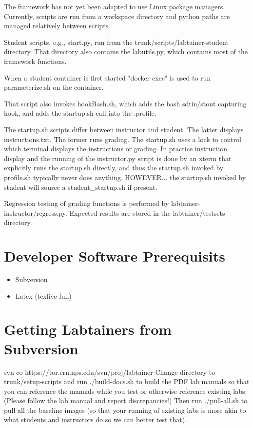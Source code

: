 The framework has not yet been adapted to use Linux package managers.
Currently, scripts are run from a workspace directory and python
paths are managed relatively between scripts.  

Student scripts, e.g., start.py, run from the trunk/scripts/labtainer-student directory.
That directory also contains the labutils.py, which contains most of the framework
functions.

When a student container is first started "docker exec" is used
to run parameterize.sh on the container.

That script also invokes hookBash.sh, which adds the bash
sdtin/stout capturing hook, and adds the startup.sh call
into the .profile.

The startup.sh scripts differ between instructor and student.  The latter
displays instructions.txt.  The former runs grading.
The startup.sh uses a lock to control which
terminal displays the instructions or grading.  In practice instruction
display and the running of the instructor.py script is done by
an xterm that explicitly runs the startup.sh directly, and thus
the startup.sh invoked by profile.sh typically never does anything.
HOWEVER... the startup.sh invoked by student will source a student_startup.sh if present.

Regression testing of grading functions is performed by labtainer-instructor/regress.py.
Expected results are stored in the labtainer/testsets directory.

\section{Developer Software Prerequisits}
\begin {itemize}
\item Subversion
\item Latex (texlive-full)
\end {itemize}


\section{Getting Labtainers from Subversion}
svn co https://tor.ern.nps.edu/svn/proj/labtainer
Change directory to trunk/setup-scripts and run ./build-docs.sh to build the PDF lab
manuals so that you can reference the manuals while you test or otherwise reference
existing labs.  (Please follow the lab manual and report discrepancies!)
Then run ./pull-all.sh to pull all the baseline images (so that your running of 
existing labs is more akin to what students and instructors do so we can better test that).

